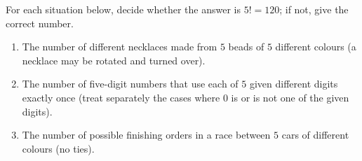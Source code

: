 For each situation below, decide whether the answer is $5!=120$; if not, give the correct number.
\begin{enumerate}
\item[(a)] The number of different necklaces made from $5$ beads of $5$ different colours (a necklace may be rotated and turned over).
\item[(b)] The number of five-digit numbers that use each of $5$ given different digits exactly once (treat separately the cases where $0$ is or is not one of the given digits).
\item[(c)] The number of possible finishing orders in a race between $5$ cars of different colours (no ties).
\end{enumerate}
